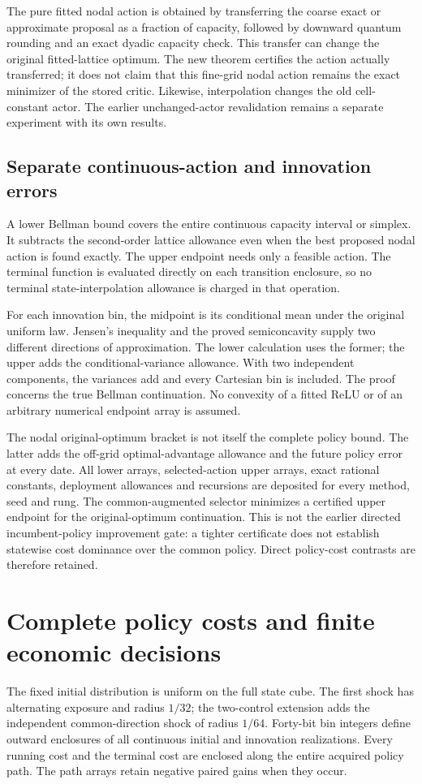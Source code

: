 The pure fitted nodal action is obtained by transferring the coarse exact or approximate proposal as a fraction of capacity, followed by downward quantum rounding and an exact dyadic capacity check. This transfer can change the original fitted-lattice optimum. The new theorem certifies the action actually transferred; it does not claim that this fine-grid nodal action remains the exact minimizer of the stored critic. Likewise, interpolation changes the old cell-constant actor. The earlier unchanged-actor revalidation remains a separate experiment with its own results.

\subsection{Separate continuous-action and innovation errors}
A lower Bellman bound covers the entire continuous capacity interval or simplex. It subtracts the second-order lattice allowance even when the best proposed nodal action is found exactly. The upper endpoint needs only a feasible action. The terminal function is evaluated directly on each transition enclosure, so no terminal state-interpolation allowance is charged in that operation.

For each innovation bin, the midpoint is its conditional mean under the original uniform law. Jensen's inequality and the proved semiconcavity supply two different directions of approximation. The lower calculation uses the former; the upper adds the conditional-variance allowance. With two independent components, the variances add and every Cartesian bin is included. The proof concerns the true Bellman continuation. No convexity of a fitted ReLU or of an arbitrary numerical endpoint array is assumed.

The nodal original-optimum bracket is not itself the complete policy bound. The latter adds the off-grid optimal-advantage allowance and the future policy error at every date. All lower arrays, selected-action upper arrays, exact rational constants, deployment allowances and recursions are deposited for every method, seed and rung. The common-augmented selector minimizes a certified upper endpoint for the original-optimum continuation. This is not the earlier directed incumbent-policy improvement gate: a tighter certificate does not establish statewise cost dominance over the common policy. Direct policy-cost contrasts are therefore retained.




\section{Complete policy costs and finite economic decisions}\label{supp:costs62}
The fixed initial distribution is uniform on the full state cube. The first shock has alternating exposure and radius $1/32$; the two-control extension adds the independent common-direction shock of radius $1/64$. Forty-bit bin integers define outward enclosures of all continuous initial and innovation realizations. Every running cost and the terminal cost are enclosed along the entire acquired policy path. The path arrays retain negative paired gains when they occur.

